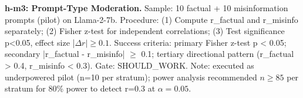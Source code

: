 \textbf{h-m3: Prompt-Type Moderation.} Sample: 10 factual + 10 misinformation prompts (pilot) on Llama-2-7b. Procedure: (1) Compute r\_factual and r\_misinfo separately; (2) Fisher z-test for independent correlations; (3) Test significance p<0.05, effect size |$\Delta r|\geq 0.1$. Success criteria: primary Fisher z-test p < 0.05; secondary |r\_factual - r\_misinfo| $\geq$ 0.1; tertiary directional pattern (r\_factual > 0.4, r\_misinfo < 0.3). Gate: SHOULD\_WORK. Note: executed as underpowered pilot (n=10 per stratum); power analysis recommended $n\geq 85$ per stratum for 80\% power to detect r=0.3 at $\alpha =0.05$.

